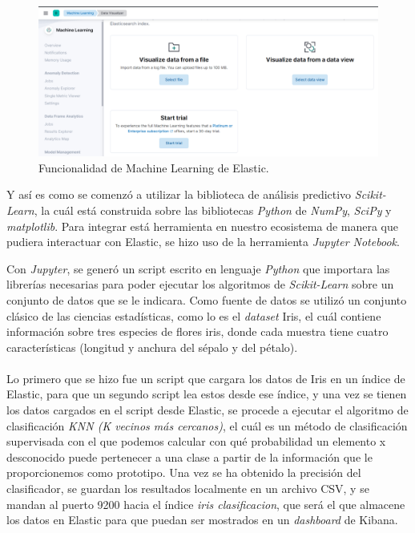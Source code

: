 \begin{figure}
    \centering
    \includegraphics[width=1\linewidth]{img/machineLearning.png}
    \caption{Funcionalidad de Machine Learning de Elastic.}
    \label{fig:machine}
\end{figure}

Y así es como se comenzó a utilizar la biblioteca de análisis predictivo \textit{Scikit-Learn}, la cuál está construida sobre las bibliotecas \textit{Python} de \textit{NumPy}, \textit{SciPy} y \textit{matplotlib}. Para integrar está herramienta en nuestro ecosistema de manera que pudiera interactuar con Elastic, se hizo uso de la herramienta  \textit{Jupyter Notebook}. 

Con \textit{Jupyter}, se generó un script escrito en lenguaje \textit{Python} que importara las librerías necesarias para poder ejecutar los algoritmos de \textit{Scikit-Learn} sobre un conjunto de datos que se le indicara. Como fuente de datos se utilizó un conjunto clásico de las ciencias estadísticas, como lo es el \textit{dataset} Iris, el cuál contiene información sobre tres especies de flores iris, donde cada muestra tiene cuatro características (longitud y anchura del sépalo y del pétalo).

\paragraph{}
\paragraph{}

Lo primero que se hizo fue un script que cargara los datos de Iris en un índice de Elastic, para que un segundo script lea estos desde ese índice, y una vez se tienen los datos cargados en el script desde Elastic, se procede a ejecutar el algoritmo de clasificación \textit{KNN (K vecinos más cercanos)}\cite{knn},  el cuál es un método de clasificación supervisada con el que podemos calcular con qué probabilidad un elemento x desconocido puede pertenecer a una clase a partir de la información que le proporcionemos como prototipo. Una vez se ha obtenido la precisión del clasificador, se guardan los resultados localmente en un archivo CSV, y se mandan al puerto 9200 hacia el índice \textit{iris clasificacion}, que será el que almacene los datos en Elastic para que puedan ser mostrados en un \textit{dashboard} de Kibana.

